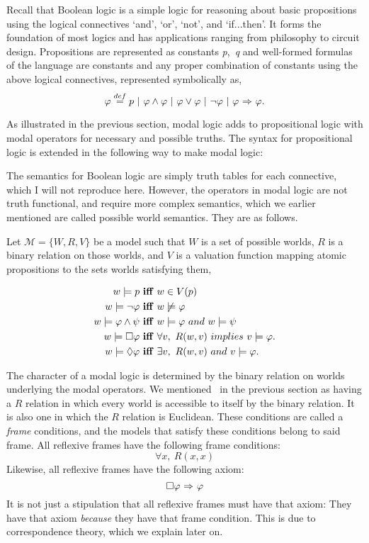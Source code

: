 Recall that Boolean logic is a simple logic for reasoning about basic propositions using the logical connectives `and', `or', `not', and `if...then'. It forms the foundation of most logics and has applications ranging from philosophy to circuit design. Propositions are represented as constants {\emph p,\ \emph q} and well-formed formulas of the language are constants and any proper combination of constants using the above logical connectives, represented symbolically as,
$$\varphi \stackrel{def}{=} p\  |\  \varphi \wedge \varphi\  |\  \varphi \vee \varphi\  |\ \neg \varphi \ |\   \varphi {\ \Rightarrow \ } \varphi. 
$$

As illustrated in the previous section, modal logic adds to propositional logic with modal operators for necessary and possible truths. The syntax for propositional logic is extended in the following way to make modal logic:


The semantics for Boolean logic are simply truth tables for each connective, which I will not reproduce here. However, the operators in modal logic are not truth functional, and require more complex semantics, which we earlier mentioned are called possible world semantics. They are as follows.

Let $\mathcal{M} = \{W, R, V\}$ be a model such that $W$ is a set of possible worlds, $R$ is a binary relation on those worlds, and $V$ is a valuation function mapping atomic propositions to the sets worlds satisfying them,  

\begin{align*}
w \models p\  &\mathbf{iff}\ w \in V(p) \\
w \models \neg \varphi\  &\mathbf{iff}\  w\not\models \varphi  \\
w \models \varphi \wedge \psi\ &\mathbf{iff}\ w\models \varphi\ \mathnormal{and}\ w\models \psi \\
w \models \Box \varphi\  &\mathbf{iff}\ \forall v,\ R(w,v)\  \mathnormal{implies}\ v \models \varphi. \\
w \models \Diamond \varphi\ &\mathbf{iff}\ \exists v,\ R(w,v)\ \mathnormal{and}\ v\models \varphi.
\end{align*}

The character of a modal logic is determined by the binary relation on worlds underlying the modal operators. We mentioned \SFive\ in the previous section as having a $R$ relation in which every world is accessible to itself by the binary relation. It is also one in which the $R$ relation is Euclidean. These conditions are called a \emph{frame} conditions, and the models that satisfy these conditions belong to said frame. All reflexive frames have the following frame conditions:
\begin{equation}
\forall x,\ R(x,x)
\end{equation}
Likewise, all reflexive frames have the following axiom:
\begin{equation}
	\Box \varphi {\ \Rightarrow \ } \varphi
\end{equation}
It is not just a stipulation that all reflexive frames must have that axiom: They have that axiom \emph{because} they have that frame condition. This is due to correspondence theory, which we explain later on.

